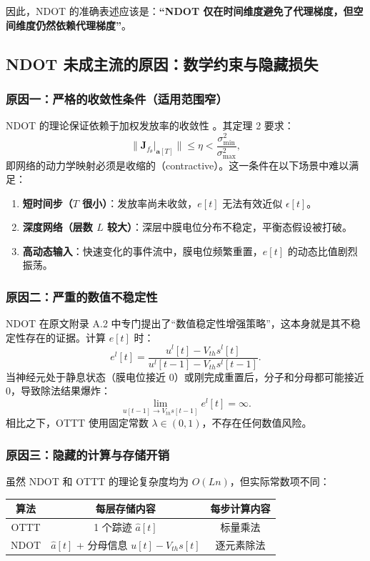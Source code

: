 \documentclass[journal,12pt,onecolumn]{IEEEtran}
\begin{document}
因此，NDOT 的准确表述应该是：\textbf{“NDOT 仅在时间维度避免了代理梯度，但空间维度仍然依赖代理梯度”}。

\subsection{NDOT 未成主流的原因：数学约束与隐藏损失}

\subsubsection{原因一：严格的收敛性条件（适用范围窄）}

NDOT 的理论保证依赖于加权发放率的收敛性 \cite{jiang_ndot_nodate}。其定理 2 要求：
\[
\| \mathbf{J}_{f_{\theta}}|_{\mathbf{a}[T]} \| \leq \eta < \frac{\sigma_{\min}^2}{\sigma_{\max}^2},
\]
即网络的动力学映射必须是收缩的（contractive）。这一条件在以下场景中难以满足：

\begin{enumerate}
    \item \textbf{短时间步（\(T\) 很小）}：发放率尚未收敛，\(e[t]\) 无法有效近似 \(\epsilon[t]\)。
    \item \textbf{深度网络（层数 \(L\) 较大）}：深层中膜电位分布不稳定，平衡态假设被打破。
    \item \textbf{高动态输入}：快速变化的事件流中，膜电位频繁重置，\(e[t]\) 的动态比值剧烈振荡。
\end{enumerate}

\subsubsection{原因二：严重的数值不稳定性}

NDOT 在原文附录 A.2 中专门提出了“数值稳定性增强策略”，这本身就是其不稳定性存在的证据。计算 \(e[t]\) 时：
\[
e^l[t] = \frac{u^l[t] - V_{th}s^l[t]}{u^l[t-1] - V_{th}s^l[t-1]}.
\]
当神经元处于静息状态（膜电位接近 0）或刚完成重置后，分子和分母都可能接近 0，导致除法结果爆炸：
\[
\lim_{u[t-1] \to V_{th}s[t-1]} e^l[t] = \infty.
\]
相比之下，OTTT 使用固定常数 \(\lambda \in (0,1)\)，不存在任何数值风险。

\subsubsection{原因三：隐藏的计算与存储开销}

虽然 NDOT 和 OTTT 的理论复杂度均为 \(O(Ln)\)，但实际常数项不同：

\begin{center}
\begin{tabular}{|c|c|c|}
\hline
算法 & 每层存储内容 & 每步计算内容 \\
\hline
OTTT & 1 个踪迹 \(\hat{a}[t]\) & 标量乘法 \\
NDOT & \(\hat{a}[t]\) + 分母信息 \(u[t] - V_{th}s[t]\) & 逐元素除法 \\
\hline
\end{tabular}
\end{center}
\end{document}

